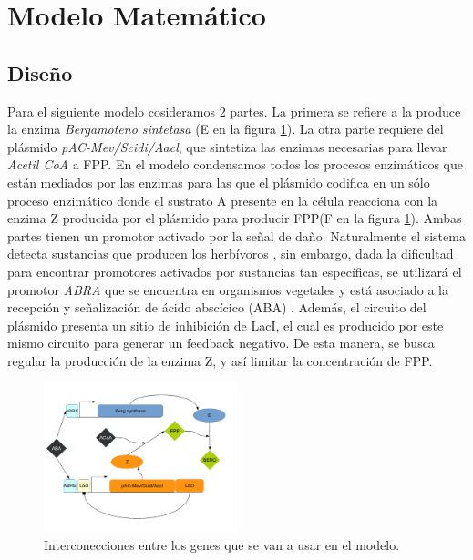 \documentclass[12pt]{article}
\begin{document}
\section{Modelo Matem\'atico}
\label{sec:model}
\subsection{Dise\~no}

Para el siguiente modelo cosideramos 2 partes. La primera se refiere a la produce la enzima \emph{Bergamoteno sintetasa} (E en la figura \ref{fig:Circuit}). La otra parte requiere del pl\'asmido \emph{pAC-Mev/Scidi/Aacl}, que sintetiza las enzimas necesarias para llevar \emph{Acetil CoA} a FPP. En el modelo condensamos todos los procesos enzim\'aticos que est\'an mediados por las enzimas para las que el pl\'asmido codifica en un s\'olo proceso enzim\'atico donde el sustrato A presente en la c\'elula reacciona con la enzima Z producida por el pl\'asmido para producir FPP(F en la figura \ref{fig:Circuit}). Ambas partes tienen un promotor activado por la se\~nal de da\~no. Naturalmente el sistema detecta sustancias que producen los herb\'ivoros , sin embargo, dada la dificultad para encontrar promotores activados por sustancias tan espec\'ificas, se utilizar\'a el promotor \emph{ABRA} que se encuentra en organismos vegetales y est\'a asociado a la recepci\'on y señalizaci\'on de \'acido absc\'icico (ABA) . Adem\'as, el circuito del pl\'asmido presenta un sitio de inhibici\'on de LacI, el cual es producido por este mismo circuito para generar un feedback negativo. De esta manera, se busca regular la producci\'on de la enzima Z, y as\'i limitar la concentraci\'on de FPP.

\begin{figure}[H]
  \centering
  \includegraphics[width=0.5\textwidth]{Circuit.png}
  \caption{\label{fig:Circuit} Interconecciones entre los genes que se van a usar en el modelo.}
\end{figure}
\end{document}
